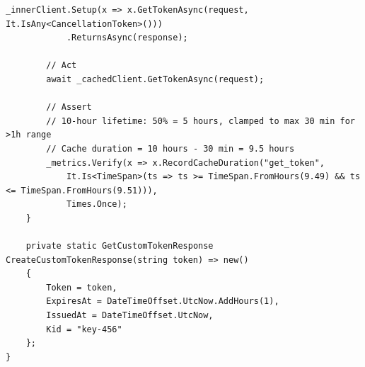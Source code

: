 \begin{lstlisting}[language={[Sharp]C},
  label={lst:app-cached-client-tests},
  caption={Класс CachedAuthJwtClientTests: набор юнит-тестов для кеширующего клиента}]
        _innerClient.Setup(x => x.GetTokenAsync(request, It.IsAny<CancellationToken>()))
            .ReturnsAsync(response);

        // Act
        await _cachedClient.GetTokenAsync(request);

        // Assert
        // 10-hour lifetime: 50% = 5 hours, clamped to max 30 min for >1h range
        // Cache duration = 10 hours - 30 min = 9.5 hours
        _metrics.Verify(x => x.RecordCacheDuration("get_token",
            It.Is<TimeSpan>(ts => ts >= TimeSpan.FromHours(9.49) && ts <= TimeSpan.FromHours(9.51))),
            Times.Once);
    }

    private static GetCustomTokenResponse CreateCustomTokenResponse(string token) => new()
    {
        Token = token,
        ExpiresAt = DateTimeOffset.UtcNow.AddHours(1),
        IssuedAt = DateTimeOffset.UtcNow,
        Kid = "key-456"
    };
}
\end{lstlisting}
